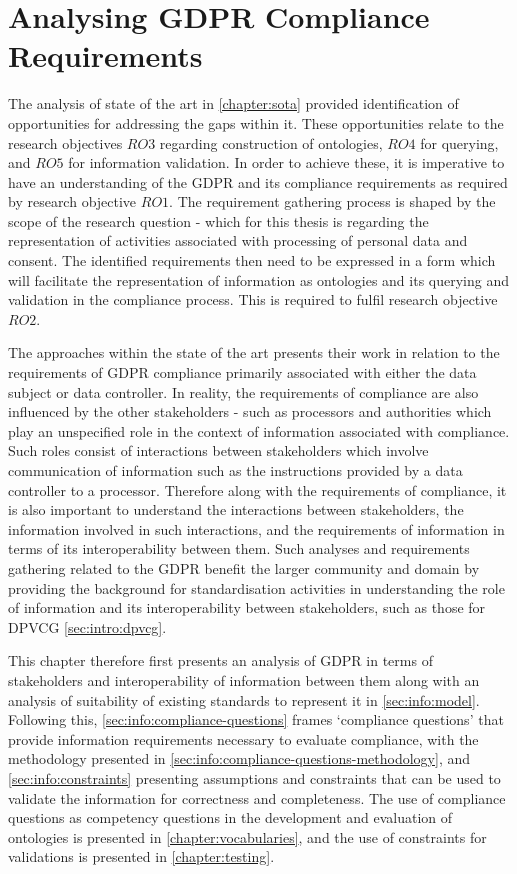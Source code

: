 \chapter{Analysing GDPR Compliance Requirements}
\label{chapter:information}

The analysis of state of the art in \autoref{chapter:sota} provided identification of opportunities for addressing the gaps within it.
These opportunities relate to the research objectives $RO3$ regarding construction of ontologies, $RO4$ for querying, and $RO5$ for information validation.
In order to achieve these, it is imperative to have an understanding of the GDPR and its compliance requirements as required by research objective $RO1$.
The requirement gathering process is shaped by the scope of the research question - which for this thesis is regarding the representation of activities associated with processing of personal data and consent.
The identified requirements then need to be expressed in a form which will facilitate the representation of information as ontologies and its querying and validation in the compliance process. This is required to fulfil research objective $RO2$.

The approaches within the state of the art presents their work in relation to the requirements of GDPR compliance primarily associated with either the data subject or data controller.
In reality, the requirements of compliance are also influenced by the other stakeholders - such as processors and authorities which play an unspecified role in the context of information associated with compliance.
Such roles consist of interactions between stakeholders which involve communication of information such as the instructions provided by a data controller to a processor.
Therefore along with the requirements of compliance, it is also important to understand the interactions between stakeholders, the information involved in such interactions, and the requirements of information in terms of its interoperability between them.
Such analyses and requirements gathering related to the GDPR benefit the larger community and domain by providing the background for standardisation activities in understanding the role of information and its interoperability between stakeholders, such as those for DPVCG \autoref{sec:intro:dpvcg}.

This chapter therefore first presents an analysis of GDPR in terms of stakeholders and interoperability of information between them along with an analysis of suitability of existing standards to represent it in \autoref{sec:info:model}.
Following this, \autoref{sec:info:compliance-questions} frames `compliance questions' that provide information requirements necessary to evaluate compliance, with the methodology presented in \autoref{sec:info:compliance-questions-methodology}, and \autoref{sec:info:constraints} presenting assumptions and constraints that can be used to validate the information for correctness and completeness.
The use of compliance questions as competency questions in the development and evaluation of ontologies is presented in \autoref{chapter:vocabularies}, and the use of constraints for validations is presented in \autoref{chapter:testing}.

